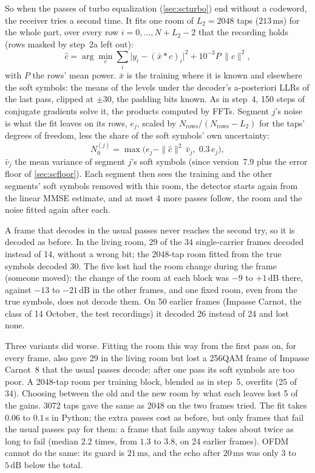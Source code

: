 \documentclass[11pt,a4paper]{article}
\newcommand{\ms}{\,\mathrm{ms}}
\newcommand{\dB}{\,\mathrm{dB}}
\theoremstyle{remark}
\begin{document}
So when the passes of turbo equalization (\cref{sec:scturbo}) end without a codeword, the receiver tries a second time. It fits one room of $L_2 = 2048$ taps ($213\ms$) for the whole part, over every row $i = 0, \dots, N + L_2 - 2$ that the recording holds (rows masked by step~2a left out):
\begin{equation}
\hat c = \arg\min_c \sum_i \bigl|y_i - (\bar x * c)_i\bigr|^2 + 10^{-3} P\, \|c\|^2,
\end{equation}
with $P$ the rows' mean power. $\bar x$ is the training where it is known and elsewhere the soft symbols: the means of the levels under the decoder's a-posteriori LLRs of the last pass, clipped at $\pm 30$, the padding bits known. As in step~4, 150 steps of conjugate gradients solve it, the products computed by FFTs. Segment $j$'s noise is what the fit leaves on its rows, $e_j$, scaled by $N_{\mathrm{rows}}/(N_{\mathrm{rows}} - L_2)$ for the taps' degrees of freedom, less the share of the soft symbols' own uncertainty:
\begin{equation}
N_0^{(j)} = \max\bigl(e_j - \|\hat c\|^2\, \bar v_j,\; 0.3\, e_j\bigr),
\end{equation}
$\bar v_j$ the mean variance of segment $j$'s soft symbols (since version~7.9 plus the error floor of \cref{sec:scfloor}). Each segment then sees the training and the other segments' soft symbols removed with this room, the detector starts again from the linear MMSE estimate, and at most 4 more passes follow, the room and the noise fitted again after each.

A frame that decodes in the usual passes never reaches the second try, so it is decoded as before. In the living room, 29 of the 34 single-carrier frames decoded instead of 14, without a wrong bit; the 2048-tap room fitted from the true symbols decoded 30. The five lost had the room change during the frame (someone moved): the change of the room at each block was $-9$ to $+1\dB$ there, against $-13$ to $-21\dB$ in the other frames, and one fixed room, even from the true symbols, does not decode them. On 50 earlier frames (Impasse Carnot, the class of 14 October, the test recordings) it decoded 26 instead of 24 and lost none.

Three variants did worse. Fitting the room this way from the first pass on, for every frame, also gave 29 in the living room but lost a 256QAM frame of Impasse Carnot~8 that the usual passes decode: after one pass its soft symbols are too poor. A 2048-tap room per training block, blended as in step~5, overfits (25 of 34). Choosing between the old and the new room by what each leaves lost 5 of the gains. 3072 taps gave the same as 2048 on the two frames tried. The fit takes $0.06$ to $0.1$\,s in Python; the extra passes cost as before, but only frames that fail the usual passes pay for them: a frame that fails anyway takes about twice as long to fail (median $2.2$ times, from $1.3$ to $3.8$, on 24 earlier frames). OFDM cannot do the same: its guard is $21\ms$, and the echo after $20\ms$ was only 3 to $5\dB$ below the total.
\end{document}
